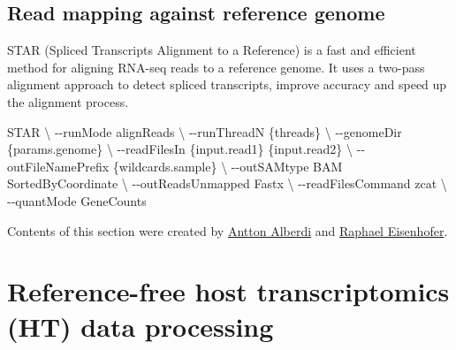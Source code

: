 \documentclass[
]{book}
\newenvironment{Shaded}{\begin{snugshade}}{\end{snugshade}}
\newcommand{\AttributeTok}[1]{\textcolor[rgb]{0.13,0.29,0.53}{#1}}
\newcommand{\DataTypeTok}[1]{\textcolor[rgb]{0.13,0.29,0.53}{#1}}
\newcommand{\ExtensionTok}[1]{#1}
\newcommand{\NormalTok}[1]{#1}
\begin{document}
\normalsize

\hypertarget{read-mapping-against-reference-genome}{%
\subsection*{Read mapping against reference genome}\label{read-mapping-against-reference-genome}}

STAR (Spliced Transcripts Alignment to a Reference) is a fast and efficient method for aligning RNA-seq reads to a reference genome. It uses a two-pass alignment approach to detect spliced transcripts, improve accuracy and speed up the alignment process.

\small

\begin{Shaded}
\begin{Highlighting}[]
\ExtensionTok{STAR} \DataTypeTok{\textbackslash{}}
      \AttributeTok{{-}{-}runMode}\NormalTok{ alignReads }\DataTypeTok{\textbackslash{}}
      \AttributeTok{{-}{-}runThreadN}\NormalTok{ \{threads\} }\DataTypeTok{\textbackslash{}}
      \AttributeTok{{-}{-}genomeDir}\NormalTok{ \{params.genome\} }\DataTypeTok{\textbackslash{}}
      \AttributeTok{{-}{-}readFilesIn}\NormalTok{ \{input.read1\} \{input.read2\} }\DataTypeTok{\textbackslash{}}
      \AttributeTok{{-}{-}outFileNamePrefix}\NormalTok{ \{wildcards.sample\} }\DataTypeTok{\textbackslash{}}
      \AttributeTok{{-}{-}outSAMtype}\NormalTok{ BAM SortedByCoordinate }\DataTypeTok{\textbackslash{}}
      \AttributeTok{{-}{-}outReadsUnmapped}\NormalTok{ Fastx }\DataTypeTok{\textbackslash{}}
      \AttributeTok{{-}{-}readFilesCommand}\NormalTok{ zcat }\DataTypeTok{\textbackslash{}}
      \AttributeTok{{-}{-}quantMode}\NormalTok{ GeneCounts}
\end{Highlighting}
\end{Shaded}

\normalsize

Contents of this section were created by \protect\hyperlink{antton-alberdi}{Antton Alberdi} and \protect\hyperlink{raphael-eisenhofer}{Raphael Eisenhofer}.

\hypertarget{host-transcriptomics-data-processing-reference-free}{%
\section{Reference-free host transcriptomics (HT) data processing}\label{host-transcriptomics-data-processing-reference-free}}
\end{document}

